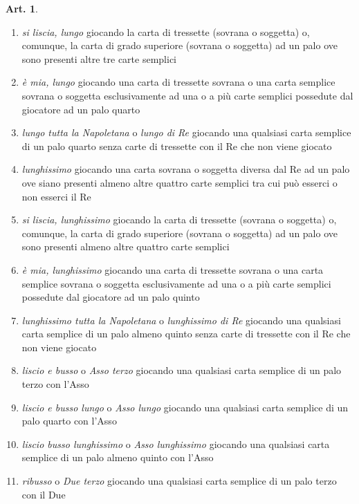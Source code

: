 \documentclass[italian,a4paper]{article}
\theoremstyle{definition}
\newtheorem{art}{Art.}
\begin{document}
\begin{art}
\begin{enumerate}
\item     \emph{si liscia, lungo} giocando la carta di tressette (sovrana o
soggetta) o, comunque, la carta di grado superiore (sovrana o soggetta) ad
un palo ove sono  presenti altre tre carte semplici

\item      \emph{è mia, lungo} giocando una carta di tressette sovrana o una carta
semplice sovrana o soggetta esclusivamente ad una o a più carte semplici
possedute dal giocatore ad un palo quarto 

\item      \emph{lungo tutta la Napoletana} o \emph{lungo di Re} giocando una qualsiasi
carta semplice di un palo quarto senza carte di tressette con il Re che non
viene giocato

\item      \emph{lunghissimo} giocando una carta sovrana o soggetta diversa dal Re
ad un palo ove siano presenti almeno altre quattro carte semplici tra cui
può esserci o non esserci il Re

\item      \emph{si liscia, lunghissimo} giocando la carta di tressette (sovrana o
soggetta) o, comunque, la carta di grado superiore (sovrana o soggetta) ad
un palo ove sono  presenti almeno altre quattro carte semplici

\item      \emph{è mia, lunghissimo} giocando una carta di tressette sovrana o una
carta semplice sovrana o soggetta esclusivamente ad una o a più carte
semplici possedute dal giocatore ad un palo quinto

\item      \emph{lunghissimo tutta la Napoletana} o \emph{lunghissimo di Re} giocando una
qualsiasi carta semplice di un palo almeno quinto senza carte di tressette
con il Re che non viene giocato

\item      \emph{liscio e busso} o \emph{Asso terzo} giocando una qualsiasi carta semplice
di un palo terzo con l’Asso

\item      \emph{liscio e busso lungo} o \emph{Asso lungo} giocando una qualsiasi carta
semplice di un palo quarto con l’Asso

\item      \emph{liscio  busso lunghissimo} o \emph{Asso lunghissimo} giocando una
qualsiasi carta semplice di un palo almeno quinto con l’Asso

\item      \emph{ribusso} o \emph{Due terzo} giocando una qualsiasi carta semplice di un
palo terzo con il Due


\end{enumerate}
\end{art}
\end{document}
